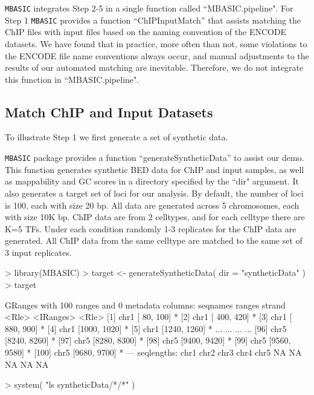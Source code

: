 \documentclass[a4paper,10pt]{article}
\begin{document}
\texttt{MBASIC} integrates Step 2-5 in a single function called ``MBASIC.pipeline". For Step 1 \texttt{MBASIC} provides a function ``ChIPInputMatch'' that assists matching the ChIP files with input files based on the naming convention of the ENCODE datasets. We have found that in practice, more often than not, some violations to the ENCODE file name conventions always occur, and manual adjustments to the results of our automated matching are inevitable. Therefore, we do not integrate this function in ``MBASIC.pipeline".

\subsection{Match ChIP and Input Datasets}


To illustrate Step 1 we first generate a set of synthetic data.

\texttt{MBASIC} package provides a function ``generateSyntheticData'' to assist our demo. This function generates synthetic BED data for ChIP and input samples, as well as mappability and GC scores in a directory specified by the ``dir" argument. It also generates a target set of loci for our analysis. By default, the number of loci is 100, each with size 20 bp. All data are generated across 5 chromosomes, each with size 10K bp. ChIP data are from 2 celltypes, and for each celltype there are K=5 TFs. Under each condition randomly 1-3 replicates for the ChIP data are generated. All ChIP data from the same celltype are matched to the same set of 3 input replicates. 

\begin{Schunk}
\begin{Sinput}
> library(MBASIC)
> target <- generateSyntheticData( dir = "syntheticData" )
> target
\end{Sinput}
\begin{Soutput}
GRanges with 100 ranges and 0 metadata columns:
        seqnames       ranges strand
           <Rle>    <IRanges>  <Rle>
    [1]     chr1 [  80,  100]      *
    [2]     chr1 [ 400,  420]      *
    [3]     chr1 [ 880,  900]      *
    [4]     chr1 [1000, 1020]      *
    [5]     chr1 [1240, 1260]      *
    ...      ...          ...    ...
   [96]     chr5 [8240, 8260]      *
   [97]     chr5 [8280, 8300]      *
   [98]     chr5 [9400, 9420]      *
   [99]     chr5 [9560, 9580]      *
  [100]     chr5 [9680, 9700]      *
  ---
  seqlengths:
   chr1 chr2 chr3 chr4 chr5
     NA   NA   NA   NA   NA
\end{Soutput}
\begin{Sinput}
> system( "ls syntheticData/*/*" )
\end{Sinput}
\end{Schunk}
\end{document}
